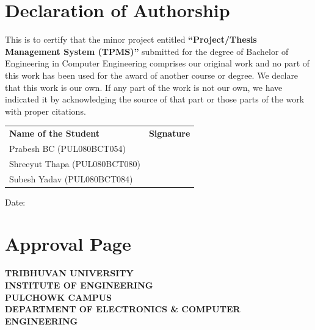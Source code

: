 \documentclass[12pt,a4paper]{report}
\begin{document}
\chapter*{Declaration of Authorship}

This is to certify that the minor project entitled \textbf{``Project/Thesis Management System (TPMS)''} submitted for the degree of Bachelor of Engineering in Computer Engineering comprises our original work and no part of this work has been used for the award of another course or degree. We declare that this work is our own. If any part of the work is not our own, we have indicated it by acknowledging the source of that part or those parts of the work with proper citations.

\vspace{1.2cm}
\noindent
\begin{tabular}{@{}p{7cm} p{6cm}@{}}
\textbf{Name of the Student} & \textbf{Signature}\\[0.8cm]
Prabesh BC (PUL080BCT054) & \underline{\hspace{4.5cm}}\\[0.8cm]
Shreeyut Thapa (PUL080BCT080) & \underline{\hspace{4.5cm}}\\[0.8cm]
Subesh Yadav (PUL080BCT084) & \underline{\hspace{4.5cm}}\\
\end{tabular}

\vspace{1.2cm}
\noindent Date:\;\underline{\hspace{5cm}}

\chapter*{Approval Page}

\begin{center}
  {\textbf{TRIBHUVAN UNIVERSITY}}\\
  {\textbf{INSTITUTE OF ENGINEERING}}\\
  {\textbf{PULCHOWK CAMPUS}}\\
  {\textbf{DEPARTMENT OF ELECTRONICS \& COMPUTER ENGINEERING}}
\end{center}
\end{document}
